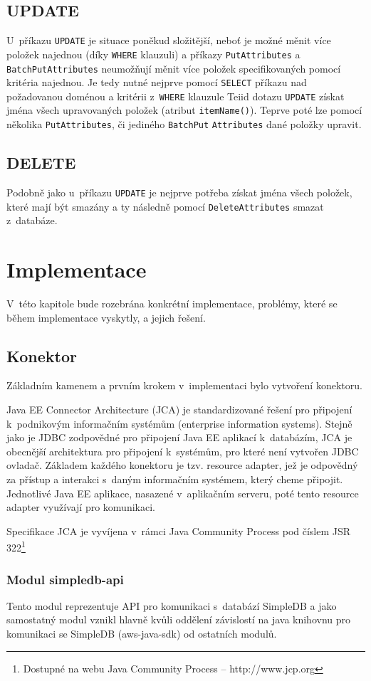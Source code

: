 \documentclass[oneside,12pt]{fithesis2}
\begin{document}
\section{UPDATE}
U~příkazu \verb<UPDATE< je situace poněkud složitější, neboť je možné měnit více položek najednou (díky \verb<WHERE< klauzuli) a příkazy \verb<PutAttributes< a \verb<BatchPutAttributes< neumožňují měnit více položek specifikovaných pomocí kritéria najednou. Je tedy nutné nejprve pomocí \verb<SELECT< příkazu nad požadovanou doménou a kritérii z~\verb<WHERE< klauzule Teiid dotazu \verb<UPDATE< získat jména všech upravovaných položek (atribut \verb<itemName()<). Teprve poté lze pomocí několika \verb<PutAttributes<, či jediného \verb<BatchPut< \verb<Attributes< dané položky upravit.
\section{DELETE}
Podobně jako u~příkazu \verb<UPDATE< je nejprve potřeba získat jména všech položek, které mají být smazány a ty následně pomocí \verb<DeleteAttributes< smazat z~databáze.
\chapter{Implementace}
\label{implementace}
V~této kapitole bude rozebrána konkrétní implementace, problémy, které se během implementace vyskytly, a jejich řešení.
\section{Konektor}
Základním kamenem a prvním krokem v~implementaci bylo vytvoření konektoru.

Java EE Connector Architecture (JCA) je standardizované řešení pro připojení k~podnikovým informačním systémům (enterprise information systems). Stejně jako je JDBC zodpovědné pro připojení Java EE aplikací k~databázím, JCA je obecnější architektura pro připojení k~systémům, pro které není vytvořen JDBC ovladač. Základem každého konektoru je tzv. resource adapter, jež je odpovědný za přístup a interakci s~daným informačním systémem, který cheme připojit. Jednotlivé Java EE aplikace, nasazené v~aplikačním serveru, poté tento resource adapter využívají pro komunikaci. 

Specifikace JCA je vyvíjena v~rámci Java Community Process pod číslem JSR 322\footnote{Dostupné na webu Java Community Process -- http://www.jcp.org}
\subsection{Modul simpledb-api}
Tento modul reprezentuje API pro komunikaci s~databází SimpleDB a jako samostatný modul vznikl hlavně kvůli oddělení závislostí na java knihovnu pro komunikaci se SimpleDB (aws-java-sdk) od ostatních modulů.
\end{document}
